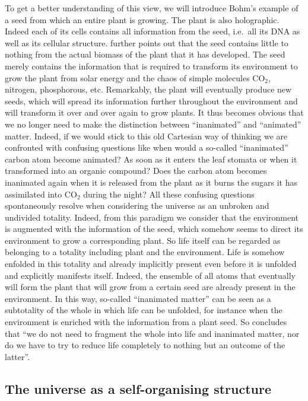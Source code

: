 \documentclass[
  11pt,
]{book}
\begin{document}
To get a better understanding of this view, we will introduce Bohm's example of a seed from which an entire plant is growing. The plant is also holographic. Indeed each of its cells contains all information from the seed, i.e.~all its DNA as well as its cellular structure. \citet{bohm1980} further points out that the seed contains little to nothing from the actual biomass of the plant that it has developed. The seed merely contains the information that is required to transform its environment to grow the plant from solar energy and the chaos of simple molecules CO\(_2\), nitrogen, phosphorous, etc. Remarkably, the plant will eventually produce new seeds, which will spread its information further throughout the environment and will transform it over and over again to grow plants. It thus becomes obvious that we no longer need to make the distinction between ``inanimated'' and ``animated'' matter. Indeed, if we would stick to this old Cartesian way of thinking we are confronted with confusing questions like when would a so-called ``inanimated'' carbon atom become animated? As soon as it enters the leaf stomata or when it transformed into an organic compound? Does the carbon atom becomes inanimated again when it is released from the plant as it burns the sugars it has assimilated into CO\(_2\) during the night? All these confusing questions spontaneously resolve when considering the universe as an unbroken and undivided totality. Indeed, from this paradigm we consider that the environment is augmented with the information of the seed, which somehow seems to direct its environment to grow a corresponding plant. So life itself can be regarded as belonging to a totality including plant and the environment. Life is somehow enfolded in this totality and already implicitly present even before it is unfolded and explicitly manifests itself. Indeed, the ensemble of all atoms that eventually will form the plant that will grow from a certain seed are already present in the environment. In this way, so-called ``inanimated matter'' can be seen as a subtotality of the whole in which life can be unfolded, for instance when the environment is enriched with the information from a plant seed. So \citet{bohm1980} concludes that ``we do not need to fragment the whole into life and inanimated matter, nor do we have to try to reduce life completely to nothing but an outcome of the latter''.

\hypertarget{the-universe-as-a-self-organising-structure}{%
\subsection{The universe as a self-organising structure}\label{the-universe-as-a-self-organising-structure}}
\end{document}
